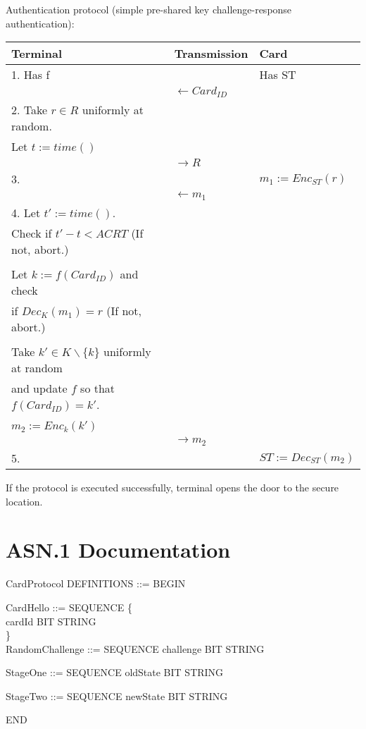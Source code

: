 \documentclass[10pt,titlepage]{article}
\begin{document}
Authentication protocol (simple pre-shared key challenge-response authentication):
 \begin{table}[!ht]
 \centering
	\begin{tabular}{| p{6.55cm}   p{2.55cm}  p{4.55cm}| }
 \hline
 Terminal & Transmission  & Card \\\hline
 1. Has f & & Has ST\\
 &  $\leftarrow Card_{ID}$  & \\
 2. Take $ r \in R $ uniformly at random. &&\\ 
Let $t := time()$ &  &  \\ 
 & $\rightarrow R$ &  \\ 
 3.& &$m_1 := Enc_{ST} (r)$ \\
 &  $\leftarrow m_1$  & \\
4. Let $t' := time()$. &&\\
Check if $t' - t < ACRT$ (If not, abort.) &&\\
&&\\
Let $k := f(Card_{ID})$ and check &&\\ 
if $Dec_K(m_1) = r$ (If not, abort.)&&\\
&&\\
Take $k' \in K \backslash \{k\} $ uniformly at random &&\\
and update $f$ so that $f(Card_{ID}) = k'$.&&\\
&&\\
$m_2 := Enc_{k}(k')$& & \\
 & $\rightarrow m_2$ &  \\ 
5. & & $ ST := Dec_{ST} (m_2)$ \\
 \hline

 \end{tabular}
 \end{table}
 
If the protocol is executed successfully, terminal opens the door to the secure location.
 

\section*{ASN.1 Documentation}

CardProtocol DEFINITIONS ::= BEGIN

    CardHello ::= SEQUENCE \{\\
        cardId       BIT STRING\\
   \}\\

    RandomChallenge ::= SEQUENCE {
        challenge    BIT STRING
    }

    StageOne ::= SEQUENCE {
        oldState     BIT STRING
    }

    StageTwo ::= SEQUENCE {
        newState     BIT STRING
    }

END
\end{document}
